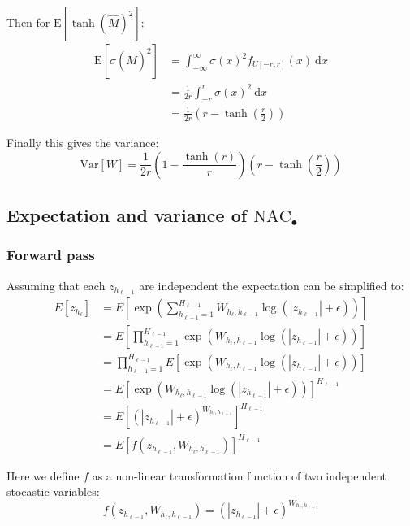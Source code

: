 Then for $\mathrm{E}[\tanh(\hat{M})^2]$:
\begin{equation}
\begin{aligned}
\mathrm{E}[\sigma(\hat{M})^2] &= \int_{-\infty}^{\infty} \sigma(x)^2 f_{U[-r, r]}(x)\ \mathrm{d}x \\
&= \frac{1}{2r} \int_{-r}^{r} \sigma(x)^2\ \mathrm{d}x \\
&= \frac{1}{2r} \left(r - \tanh\left(\frac{r}{2}\right)\right)
\end{aligned}
\end{equation}

Finally this gives the variance:
\begin{equation}
\mathrm{Var}[W] = \frac{1}{2r} \left(1 - \frac{\tanh(r)}{r}\right) \left(r - \tanh\left(\frac{r}{2}\right)\right)
\end{equation}

\subsection{Expectation and variance of $\mathrm{NAC}_{\bullet}$}
\label{sec:appendix:moments:nac-mul}
\subsubsection{Forward pass}
Assuming that each $z_{h_{\ell-1}}$ are independent the expectation can be simplified to:
\begin{equation}
\begin{aligned}
E[z_{h_\ell}] &= E\left[\exp\left(\sum_{h_{\ell-1}=1}^{H_{\ell-1}} W_{h_{\ell}, h_{\ell-1}} \log(|z_{h_{\ell-1}}| + \epsilon) \right)\right] \\
&= E\left[\prod_{h_{\ell-1}=1}^{H_{\ell-1}} \exp(W_{h_{\ell}, h_{\ell-1}} \log(|z_{h_{\ell-1}}| + \epsilon)) \right] \\
&= \prod_{h_{\ell-1}=1}^{H_{\ell-1}} E[\exp(W_{h_{\ell}, h_{\ell-1}} \log(|z_{h_{\ell-1}}| + \epsilon))] \\
&= E[\exp(W_{h_{\ell}, h_{\ell-1}} \log(|z_{h_{\ell-1}}| + \epsilon))]^{H_{\ell-1}} \\
&= E\left[(|z_{h_{\ell-1}}| + \epsilon)^{W_{h_{\ell}, h_{\ell-1}}}\right]^{H_{\ell-1}} \\
&= E\left[f(z_{h_{\ell-1}}, W_{h_{\ell}, h_{\ell-1}})\right]^{H_{\ell-1}}
\end{aligned}
\end{equation}

Here we define $f$ as a non-linear transformation function of two independent stocastic variables:
\begin{equation}
f(z_{h_{\ell-1}}, W_{h_{\ell}, h_{\ell-1}}) = (|z_{h_{\ell-1}}| + \epsilon)^{W_{h_{\ell}, h_{\ell-1}}}
\end{equation}

